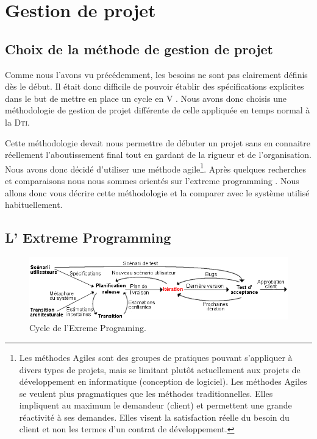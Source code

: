 \section{Gestion de projet}
    \subsection{Choix de la méthode de gestion de projet}
Comme nous l'avons vu précédemment, les besoins ne sont pas clairement définis dès le début. Il était donc difficile de pouvoir établir des spécifications explicites dans le but de mettre en place un cycle en V . Nous avons donc choisis une méthodologie de gestion de projet différente de celle appliquée en temps normal à la \textsc{Dti}.

Cette méthodologie devait nous permettre de débuter un projet sans en connaitre réellement l'aboutissement final tout en gardant de la rigueur et de l'organisation. Nous avons donc décidé d'utiliser une méthode agile\footnote{Les méthodes Agiles sont des groupes de pratiques pouvant s'appliquer à divers types de projets, mais se limitant plutôt actuellement aux projets de développement en informatique (conception de logiciel). Les méthodes Agiles se veulent plus pragmatiques que les méthodes traditionnelles. Elles impliquent au maximum le demandeur (client) et permettent une grande réactivité à ses demandes. Elles visent la satisfaction réelle du besoin du client et non les termes d'un contrat de développement. }. Après quelques recherches et comparaisons nous nous sommes orientés sur l'extreme programming . Nous allons donc vous décrire cette méthodologie et la comparer avec le système utilisé habituellement.

    \subsection{L' Extreme Programming\label{extreme}}

\begin{figure}[!h]
\center
\includegraphics[width=15cm]{images/xp.png}
\caption{Cycle de l'Exreme Programing.}
\label{XP}
\end{figure}

